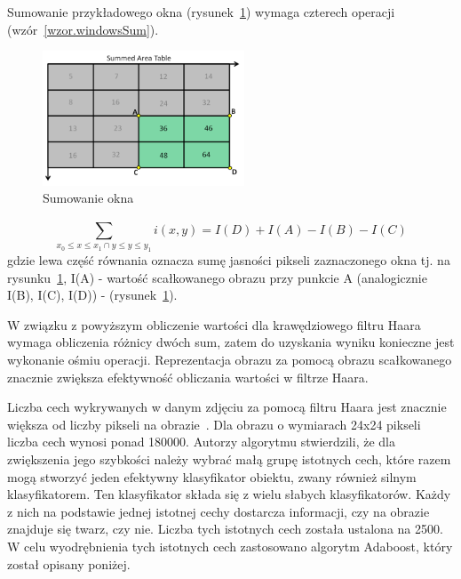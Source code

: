 \documentclass[a4paper,twoside,12pt]{book}
\begin{document}
    Sumowanie przykładowego okna (rysunek~\ref{fig.sumowanieOkna}) wymaga czterech operacji (wzór~\ref{wzor.windowsSum}).
    \begin{figure}
        \centering
        \includegraphics[width=6cm]{Obrazy/sumowanieOkna.jpg}
        \caption{Sumowanie okna~\cite{integralImages}}
        \label{fig.sumowanieOkna}
    \end{figure}


    \large
    \begin{equation}
        \sum_{x_0\leq x \leq x_1\cap {y}\leq y \leq y_1}^{} i(x,y) = I(D) + I(A) - I(B) - I(C)
        \label{wzor.windowsSum}
    \end{equation}
    \normalsize
    gdzie lewa część równania oznacza sumę jasności pikseli
    zaznaczonego okna tj.
    na rysunku~\ref{fig.sumowanieOkna}, I(A) - wartość scałkowanego obrazu przy punkcie A
    (analogicznie I(B), I(C), I(D)) - (rysunek~\ref{fig.sumowanieOkna}).

    W związku z powyższym obliczenie wartości dla krawędziowego filtru Haara wymaga obliczenia różnicy dwóch sum,
    zatem do uzyskania wyniku konieczne jest wykonanie ośmiu operacji.
    Reprezentacja obrazu za pomocą obrazu scałkowanego znacznie zwiększa efektywność obliczania wartości w filtrze
    Haara.

    Liczba cech wykrywanych w danym zdjęciu za
    pomocą filtru Haara jest znacznie większa od liczby pikseli na obrazie~\cite{violaJones}.
    Dla obrazu o wymiarach 24x24 pikseli liczba cech wynosi ponad 180000.
    Autorzy algorytmu stwierdzili, że dla zwiększenia jego szybkości należy wybrać małą grupę istotnych cech,
    które razem mogą stworzyć jeden efektywny klasyfikator obiektu, zwany również silnym klasyfikatorem. Ten
    klasyfikator składa się z wielu słabych klasyfikatorów. Każdy z nich na podstawie jednej istotnej cechy dostarcza
    informacji, czy na obrazie znajduje się twarz, czy nie. Liczba tych
    istotnych cech została ustalona na 2500.
    W celu wyodrębnienia tych istotnych cech zastosowano algorytm Adaboost, który został opisany poniżej.
\end{document}
